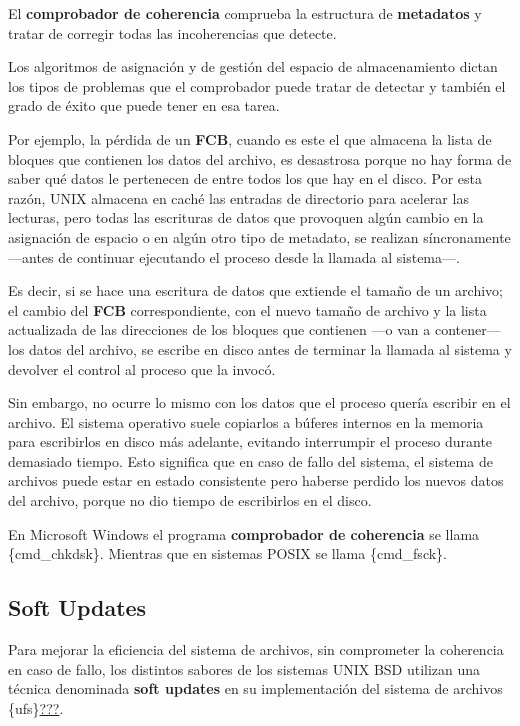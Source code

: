 El \textbf{comprobador de coherencia}{} comprueba la estructura de
\textbf{metadatos} y tratar de corregir todas las incoherencias que
detecte.

Los algoritmos de asignación y de gestión del espacio de almacenamiento
dictan los tipos de problemas que el comprobador puede tratar de
detectar y también el grado de éxito que puede tener en esa tarea.

Por ejemplo, la pérdida de un \textbf{FCB}, cuando es este el que
almacena la lista de bloques que contienen los datos del archivo, es
desastrosa porque no hay forma de saber qué datos le pertenecen de entre
todos los que hay en el disco. Por esta razón, UNIX almacena en caché
las entradas de directorio para acelerar las lecturas, pero todas las
escrituras de datos que provoquen algún cambio en la asignación de
espacio o en algún otro tipo de metadato, se realizan síncronamente
---antes de continuar ejecutando el proceso desde la llamada al
sistema---.

Es decir, si se hace una escritura de datos que extiende el tamaño de un
archivo; el cambio del \textbf{FCB} correspondiente, con el nuevo tamaño
de archivo y la lista actualizada de las direcciones de los bloques que
contienen ---o van a contener--- los datos del archivo, se escribe en
disco antes de terminar la llamada al sistema y devolver el control al
proceso que la invocó.

Sin embargo, no ocurre lo mismo con los datos que el proceso quería
escribir en el archivo. El sistema operativo suele copiarlos a búferes
internos en la memoria para escribirlos en disco más adelante, evitando
interrumpir el proceso durante demasiado tiempo. Esto significa que en
caso de fallo del sistema, el sistema de archivos puede estar en estado
consistente pero haberse perdido los nuevos datos del archivo, porque no
dio tiempo de escribirlos en el disco.

En Microsoft Windows el programa \textbf{comprobador de coherencia} se
llama \{cmd\_chkdsk\}. Mientras que en sistemas POSIX se llama
\{cmd\_fsck\}.

\subsection{Soft Updates}\label{_soft_updates}

Para mejorar la eficiencia del sistema de archivos, sin comprometer la
coherencia en caso de fallo, los distintos sabores de los sistemas UNIX
BSD utilizan una técnica denominada \textbf{{}soft updates} en su
implementación del sistema de archivos
\{ufs\}\hyperref[Ganger2000]{???}.

